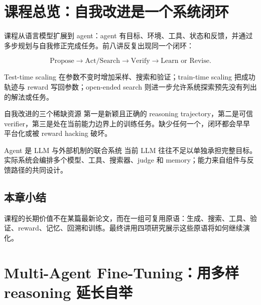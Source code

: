 \documentclass[a4paper]{article}
\begin{document}
\makelecturetitle

\section{课程总览：自我改进是一个系统闭环}

课程从语言模型扩展到 agent：agent 有目标、环境、工具、状态和反馈，并通过多步规划与自我修正完成任务。前八讲反复出现同一个闭环：

$$
\text{Propose}\rightarrow \text{Act/Search}\rightarrow
\text{Verify}\rightarrow \text{Learn or Revise}.
$$

Test-time scaling 在参数不变时增加采样、搜索和验证；train-time scaling 把成功轨迹与 reward 写回参数；open-ended search 则进一步允许系统探索预先没有列出的解法或任务。



\begin{importantbox}{自我改进的三个稀缺资源}
第一是新颖且正确的 reasoning trajectory，第二是可信 verifier，第三是处在当前能力边界上的训练任务。缺少任何一个，闭环都会早早平台化或被 reward hacking 破坏。
\end{importantbox}

\begin{knowledgebox}{Agent 是 LLM 与外部机制的联合系统}
当前 LLM 往往不足以单独承担完整目标。实际系统会编排多个模型、工具、搜索器、judge 和 memory；能力来自组件与反馈路径的共同设计。
\end{knowledgebox}

\subsection{本章小结}

课程的长期价值不在某篇最新论文，而在一组可复用原语：生成、搜索、工具、验证、reward、记忆、回溯和训练。最终讲用四项研究展示这些原语将如何继续演化。

\section{Multi-Agent Fine-Tuning：用多样 reasoning 延长自举}
\end{document}

